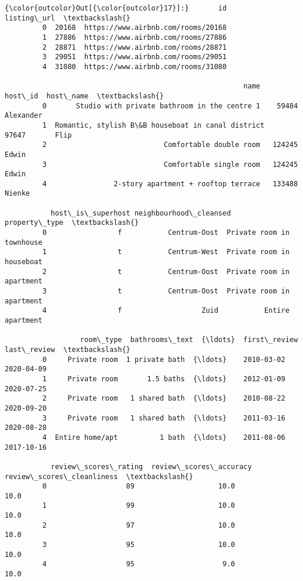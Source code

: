 \documentclass[11pt]{article}
\begin{document}
\begin{Verbatim}[commandchars=\\\{\}]
{\color{outcolor}Out[{\color{outcolor}17}]:}       id                         listing\_url  \textbackslash{}
         0  20168  https://www.airbnb.com/rooms/20168   
         1  27886  https://www.airbnb.com/rooms/27886   
         2  28871  https://www.airbnb.com/rooms/28871   
         3  29051  https://www.airbnb.com/rooms/29051   
         4  31080  https://www.airbnb.com/rooms/31080   
         
                                                         name  host\_id  host\_name  \textbackslash{}
         0       Studio with private bathroom in the centre 1    59484  Alexander   
         1  Romantic, stylish B\&B houseboat in canal district    97647       Flip   
         2                            Comfortable double room   124245      Edwin   
         3                            Comfortable single room   124245      Edwin   
         4                2-story apartment + rooftop terrace   133488     Nienke   
         
           host\_is\_superhost neighbourhood\_cleansed              property\_type  \textbackslash{}
         0                 f           Centrum-Oost  Private room in townhouse   
         1                 t           Centrum-West  Private room in houseboat   
         2                 t           Centrum-Oost  Private room in apartment   
         3                 t           Centrum-Oost  Private room in apartment   
         4                 f                   Zuid           Entire apartment   
         
                  room\_type  bathrooms\_text  {\ldots}  first\_review  last\_review  \textbackslash{}
         0     Private room  1 private bath  {\ldots}    2010-03-02   2020-04-09   
         1     Private room       1.5 baths  {\ldots}    2012-01-09   2020-07-25   
         2     Private room   1 shared bath  {\ldots}    2010-08-22   2020-09-20   
         3     Private room   1 shared bath  {\ldots}    2011-03-16   2020-08-28   
         4  Entire home/apt          1 bath  {\ldots}    2011-08-06   2017-10-16   
         
           review\_scores\_rating  review\_scores\_accuracy  review\_scores\_cleanliness  \textbackslash{}
         0                   89                    10.0                       10.0   
         1                   99                    10.0                       10.0   
         2                   97                    10.0                       10.0   
         3                   95                    10.0                       10.0   
         4                   95                     9.0                       10.0   
         

\end{Verbatim}
\end{document}

